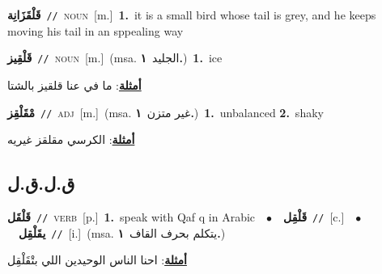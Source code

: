 \documentclass[10pt,a4paper,twoside]{article} %
\begin{document}
\begin{multicols}{2}
{\setlength\topsep{0pt}\textbf{\foreignlanguage{arabic}{قَلْقَزَانِة}}\ {\color{gray}\texttt{//}\color{black}}\ \textsc{noun}\ [m.]\ \textbf{1.}~it is a small bird whose tail is grey, and he keeps moving his tail in an sppealing way\ } \vspace{2mm}

{\setlength\topsep{0pt}\textbf{\foreignlanguage{arabic}{قَلْقِيز}}\ {\color{gray}\texttt{//}\color{black}}\ \textsc{noun}\ [m.]\ \color{gray}(msa. \foreignlanguage{arabic}{الجليد}~\foreignlanguage{arabic}{\textbf{١.}})\color{black}\ \textbf{1.}~ice\  \begin{flushright}\color{gray}\foreignlanguage{arabic}{\textbf{\underline{\foreignlanguage{arabic}{أمثلة}}}: ما في عنا قلقيز بالشتا}\end{flushright}\color{black}} \vspace{2mm}

{\setlength\topsep{0pt}\textbf{\foreignlanguage{arabic}{مْقَلْقِز}}\ {\color{gray}\texttt{//}\color{black}}\ \textsc{adj}\ [m.]\ \color{gray}(msa. \foreignlanguage{arabic}{غير متزن}~\foreignlanguage{arabic}{\textbf{١.}})\color{black}\ \textbf{1.}~unbalanced  \textbf{2.}~shaky\  \begin{flushright}\color{gray}\foreignlanguage{arabic}{\textbf{\underline{\foreignlanguage{arabic}{أمثلة}}}: الكرسي مقلقز غيريه}\end{flushright}\color{black}} \vspace{2mm}

\vspace{-3mm}
\subsection*{\color{blue}\foreignlanguage{arabic}{ق.ل.ق.ل}\color{blue}{}} 

{\setlength\topsep{0pt}\textbf{\foreignlanguage{arabic}{قَلْقَل}}\ {\color{gray}\texttt{//}\color{black}}\ \textsc{verb}\ [p.]\ \textbf{1.}~speak with Qaf q in  Arabic\ \ $\bullet$\ \ \setlength\topsep{0pt}\textbf{\foreignlanguage{arabic}{قَلْقِل}}\ {\color{gray}\texttt{//}\color{black}}\ [c.]\ \ $\bullet$\ \ \setlength\topsep{0pt}\textbf{\foreignlanguage{arabic}{يقَلْقِل}}\ {\color{gray}\texttt{//}\color{black}}\ [i.]\ \color{gray}(msa. \foreignlanguage{arabic}{يتكلم بحرف القاف}~\foreignlanguage{arabic}{\textbf{١.}})\color{black}\  \begin{flushright}\color{gray}\foreignlanguage{arabic}{\textbf{\underline{\foreignlanguage{arabic}{أمثلة}}}: احنا الناس الوحيدين اللي بتْقَلْقِل}\end{flushright}\color{black}} \vspace{2mm}


\end{multicols}
\end{document}

